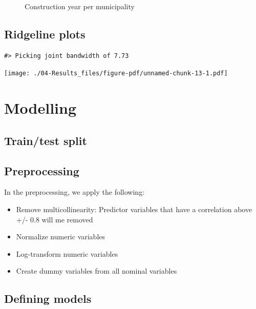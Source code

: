 \documentclass[
  letterpaper,
  DIV=11,
  numbers=noendperiod]{scrreprt}
\providecommand{\tightlist}{%
  \setlength{\itemsep}{0pt}\setlength{\parskip}{0pt}}\usepackage{longtable,booktabs,array}
\begin{document}
\begin{figure}

{\centering 

}

\caption{\label{fig-municipality-construction-year}Construction year per
municipality}

\end{figure}

\hypertarget{ridgeline-plots}{%
\subsection{Ridgeline plots}\label{ridgeline-plots}}

\begin{verbatim}
#> Picking joint bandwidth of 7.73
\end{verbatim}

\texttt{[image: ./04-Results\_files/figure-pdf/unnamed-chunk-13-1.pdf]}

\hypertarget{modelling}{%
\section{Modelling}\label{modelling}}

\hypertarget{traintest-split}{%
\subsection{Train/test split}\label{traintest-split}}

\hypertarget{preprocessing}{%
\subsection{Preprocessing}\label{preprocessing}}

In the preprocessing, we apply the following:

\begin{itemize}
\tightlist
\item
  Remove multicollinearity: Predictor variables that have a correlation
  above +/- 0.8 will me removed
\item
  Normalize numeric variables
\item
  Log-transform numeric variables
\item
  Create dummy variables from all nominal variables
\end{itemize}

\hypertarget{defining-models}{%
\subsection{Defining models}\label{defining-models}}
\end{document}
